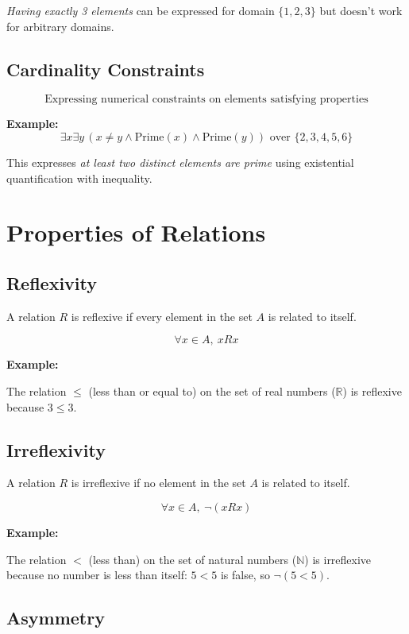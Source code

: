 \documentclass[12pt,a4paper,openany]{article}
\begin{document}
\textit{Having exactly 3 elements} can be expressed for domain $\{1,2,3\}$ but doesn't work for arbitrary domains.

\subsection{Cardinality Constraints}

$$\text{Expressing numerical constraints on elements satisfying properties}$$

\textbf{Example:} 
$$\exists x \exists y \, (x \neq y \wedge \text{Prime}(x) \wedge \text{Prime}(y)) \text{ over } \{2,3,4,5,6\}$$

This expresses \textit{at least two distinct elements are prime} using existential quantification with inequality.


\section{Properties of Relations}


\subsection{Reflexivity}\label{reflexivity}

A relation $R$ is reflexive if every element in the set $A$ is related to itself.

$$\forall x \in A, \ xRx$$

\textbf{Example:}

The relation $\leq$ (less than or equal to) on the set of real numbers ($\mathbb{R}$) is reflexive because $3 \leq 3$. 

\subsection{Irreflexivity}\label{irreflexivity}

A relation $R$ is irreflexive if no element in the set $A$ is related to itself.

$$\forall x \in A, \ \neg(xRx)$$

\textbf{Example:}

The relation $<$ (less than) on the set of natural numbers ($\mathbb{N}$) is irreflexive because no number is less than itself: $5 < 5$ is false, so $\neg(5 < 5)$.

\subsection{Asymmetry}\label{asymmetry}
\end{document}

